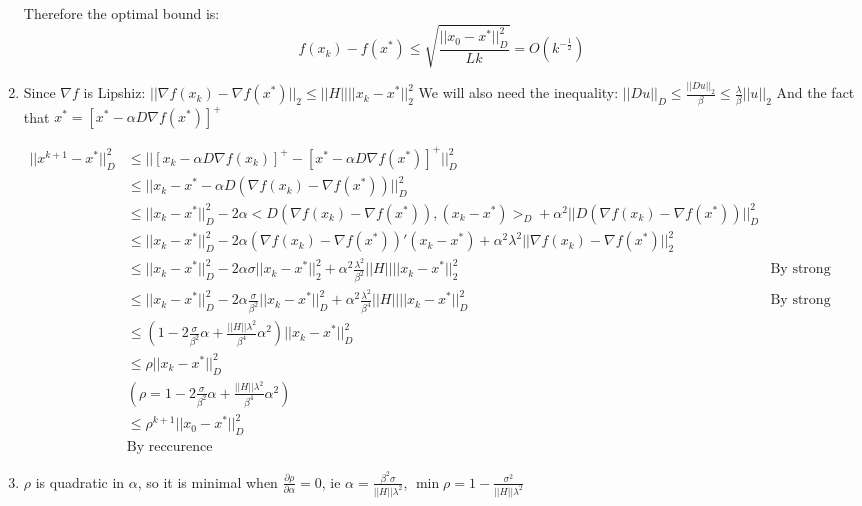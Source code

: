 \documentclass[12pt]{article}
\begin{document}
\begin{enumerate}
  Therefore the optimal bound is:
  $$f(x_k) - f(x^*) \le \sqrt{\frac{||x_0-x^*||_D^2}{Lk}} = O(k^{-\frac12})$$

\item 
  Since $\nabla f$ is Lipshiz:  $||\nabla f(x_k) - \nabla f(x^*)||_2 \le ||H|| ||x_k - x^*||_2^2$
  We will also need the inequality: $||Du||_D \le \frac{||Du||_2}{\beta} \le \frac{\lambda}{\beta} ||u||_2$
  And the fact that $x^* = [x^* - \alpha D \nabla f(x^*)]^+$
  
  \begin{align*}
    ||x^{k+1} - x^*||_D^2 & \le || [x_k - \alpha D \nabla f(x_k)]^+ - [x^* - \alpha D \nabla f(x^*)]^+||_D^2 \\
                          & \le || x_k - x^* - \alpha D(\nabla f(x_k) - \nabla f(x^*))||_D^2 \\
                          & \le ||x_k - x^*||_D^2 - 2 \alpha <D(\nabla f(x_k) - \nabla f(x^*)), (x_k - x^*)>_D + \alpha^2 ||D (\nabla f(x_k) - \nabla f(x^*))||_D^2 \\
                          & \le ||x_k - x^*||_D^2 - 2 \alpha (\nabla f(x_k) - \nabla f(x^*))' (x_k - x^*) + \alpha^2 \lambda^2 ||\nabla f(x_k) - \nabla f(x^*)||_2^2 \\
                          & \le ||x_k - x^*||_D^2 - 2 \alpha \sigma ||x_k - x^*||_2^2+ \alpha^2 \frac{\lambda^2}{\beta^2} ||H|| ||x_k - x^*||_2^2 & \text{By strong convexity}
    \\                    & \le ||x_k - x^*||_D^2 - 2 \alpha \frac{\sigma}{\beta^2} ||x_k - x^*||_D^2+ \alpha^2 \frac{\lambda^2}{\beta^4} ||H|| ||x_k - x^*||_D^2 & \text{By strong convexity}
    \\                    & \le (1 - 2\frac{\sigma}{\beta^2} \alpha + \frac{||H|| \lambda^2}{\beta^4} \alpha^2)||x_k - x^*||_D^2
    \\ & \le \rho ||x_k - x^*||_D^2 \\& (\rho = 1 - 2\frac{\sigma}{\beta^2} \alpha + \frac{||H|| \lambda^2}{\beta^4} \alpha^2)
    \\ & \le \rho^{k+1} ||x_0 - x^*||_D^2 \\&\text{By reccurence}
  \end{align*}

\item
  $\rho$ is quadratic in $\alpha$, so it is minimal when $\frac{\partial \rho}{\partial \alpha} = 0 $, ie $\alpha = \frac{\beta^2\sigma}{||H|| \lambda^2}$,
  $\min \rho = 1 - \frac{\sigma^2}{||H|| \lambda^2}$
\end{enumerate}
\end{document}
